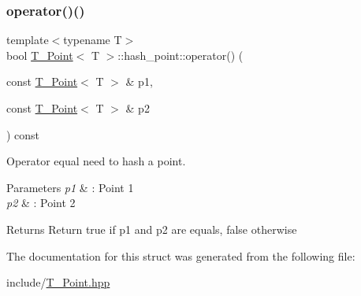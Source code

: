 \subsubsection{\texorpdfstring{operator()()}{operator()()}\hspace{0.1cm}{\footnotesize\ttfamily [4/4]}}
{\footnotesize\ttfamily template$<$typename T$>$ \\
bool \hyperlink{classT__Point}{T\+\_\+\+Point}$<$ T $>$\+::hash\+\_\+point\+::operator() (\begin{DoxyParamCaption}\item[{const \hyperlink{classT__Point}{T\+\_\+\+Point}$<$ T $>$ \&}]{p1,  }\item[{const \hyperlink{classT__Point}{T\+\_\+\+Point}$<$ T $>$ \&}]{p2 }\end{DoxyParamCaption}) const\hspace{0.3cm}{\ttfamily [inline]}}



Operator equal need to hash a point. 


\begin{DoxyParams}{Parameters}
{\em p1} & \+: Point 1 \\
\hline
{\em p2} & \+: Point 2 \\
\hline
\end{DoxyParams}
\begin{DoxyReturn}{Returns}
Return true if p1 and p2 are equals, false otherwise 
\end{DoxyReturn}


The documentation for this struct was generated from the following file\+:\begin{DoxyCompactItemize}
\item 
include/\hyperlink{T__Point_8hpp}{T\+\_\+\+Point.\+hpp}\end{DoxyCompactItemize}
